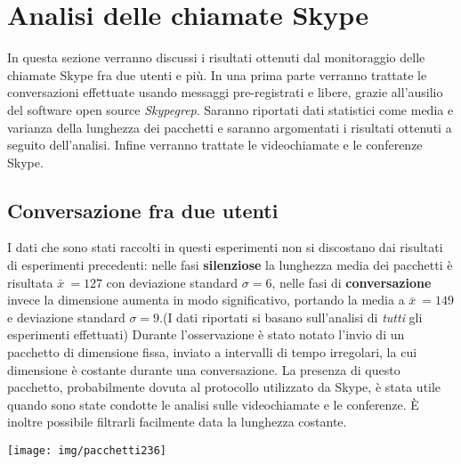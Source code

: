\section{Analisi delle chiamate Skype}
In questa sezione verranno discussi i risultati ottenuti dal monitoraggio delle chiamate Skype fra due utenti e più. In una prima parte verranno trattate le conversazioni effettuate usando messaggi pre-registrati e libere, grazie all'ausilio del software open source \emph{Skypegrep}. Saranno riportati dati statistici come media e varianza della lunghezza dei pacchetti e saranno argomentati i risultati ottenuti a seguito dell'analisi. Infine verranno trattate le videochiamate e le conferenze Skype.\newline

\subsection{Conversazione fra due utenti}

I dati che sono stati raccolti in questi esperimenti non si discostano dai risultati di esperimenti precedenti: nelle fasi \textbf{silenziose} la lunghezza media dei pacchetti è risultata $\bar x\ = 127 $
con deviazione standard $\sigma = 6 $, nelle fasi di \textbf{conversazione} invece la dimensione aumenta in modo significativo, portando la media a $\bar x\ = 149 $ e deviazione standard $\sigma = 9$.\newline (I dati riportati si basano sull'analisi di \emph{tutti} gli esperimenti effettuati)\newline\newline
Durante l'osservazione è stato notato l'invio di un pacchetto di dimensione fissa, inviato a intervalli di tempo irregolari, la cui dimensione è costante durante una conversazione. La presenza di questo pacchetto, probabilmente dovuta al protocollo utilizzato da Skype, è stata utile quando sono state condotte le analisi sulle videochiamate e le conferenze. È inoltre possibile filtrarli facilmente data la lunghezza costante.\newline
\begin{minipage}{\linewidth}
\texttt{[image: img/pacchetti236]}
\end{minipage}\newline\newline\newline

